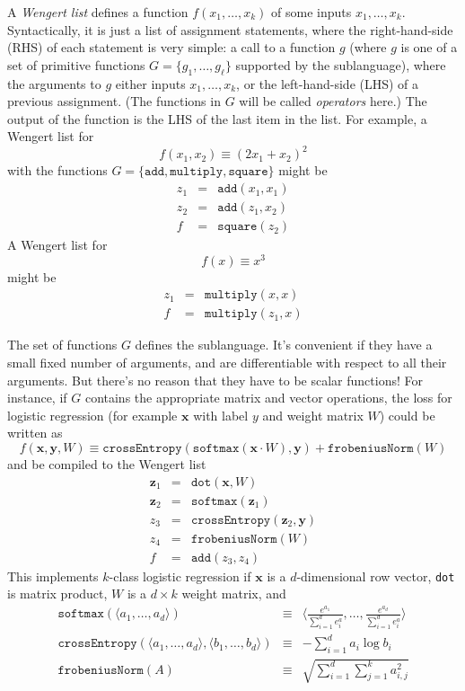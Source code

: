 \documentclass[12pt]{article}
\newcommand{\cd}[1]{\texttt{#1}}
\newcommand{\trm}[1]{\textit{#1}}
\newcommand{\vek}[1]{\textbf{#1}}
\begin{document}
A \trm{Wengert list} defines a function $f(x_1,\ldots,x_k)$ of some
inputs $x_1,\ldots,x_k$.  Syntactically, it is just a list of
assignment statements, where the right-hand-side (RHS) of each
statement is very simple: a call to a function $g$ (where $g$ is one
of a set of primitive functions $G=\{g_1,\ldots,g_\ell\}$ supported by
the sublanguage), where the arguments to $g$ either inputs
$x_1,\ldots,x_k$, or the left-hand-side (LHS) of a previous
assignment.  (The functions in $G$ will be called \trm{operators}
here.)  The output of the function is the LHS of the last item in the
list.  For example, a Wengert list for
\begin{equation} \label{eq:2x1Plusx2}
f(x_1,x_2) \equiv (2 x_1 + x_2)^2
\end{equation} 
with the functions $G = \{ \cd{add},\cd{multiply},\cd{square} \}$ might be
\begin{eqnarray*}
z_1 & = & \cd{add}(x_1,x_1) \\
z_2 & = & \cd{add}(z_1,x_2) \\
f & = & \cd{square}(z_2)
\end{eqnarray*}
A Wengert list for
\[ f(x) \equiv x^3
\] 
might be
\begin{eqnarray*}
z_1 & = & \cd{multiply}(x,x) \\
f & = & \cd{multiply}(z_1,x)
\end{eqnarray*}

The set of functions $G$ defines the sublanguage.  It's convenient if
they have a small fixed number of arguments, and are differentiable
with respect to all their arguments.  But there's no reason that they
have to be scalar functions!  For instance, if $G$ contains the
appropriate matrix and vector operations, the loss for logistic
regression (for example $\vek{x}$ with label $y$ and weight matrix
$W$) could be written as
\[ f(\vek{x},\vek{y},W) \equiv 
      \cd{crossEntropy}( \cd{softmax}(\vek{x} \cdot W ), \vek{y}) + \cd{frobeniusNorm}(W)
\] 
and be compiled to the Wengert list
\begin{eqnarray*}
 \vek{z}_1 & = & \cd{dot}(\vek{x},W) \\
 \vek{z}_2 & = & \cd{softmax}(\vek{z}_1) \\
 z_3 & = & \cd{crossEntropy}(\vek{z}_2,\vek{y}) \\
 z_4 & = & \cd{frobeniusNorm}(W) \\
 f & = & \cd{add}(z_3,z_4)
\end{eqnarray*}
This implements $k$-class logistic regression if $\vek{x}$ is a
$d$-dimensional row vector, \cd{dot} is matrix product, $W$ is a $d
\times k$ weight matrix, and 
\begin{eqnarray*}
 \cd{softmax}(\langle a_1,\ldots,a_d\rangle) & \equiv &
   \langle \frac{e^{a_1}}{\sum_{i=1}^d e^a_i}, \ldots, \frac{e^{a_d}}{\sum_{i=1}^d e^a_i} \rangle  \\
 \cd{crossEntropy}(\langle a_1,\ldots,a_d\rangle,\langle b_1,\ldots,b_d\rangle) & \equiv &
    - \sum_{i=1}^d a_i \log b_i \\
 \cd{frobeniusNorm}(A) & \equiv & \sqrt{ \sum_{i=1}^d \sum_{j=1}^k a_{i,j}^2 }
\end{eqnarray*}
\end{document}
